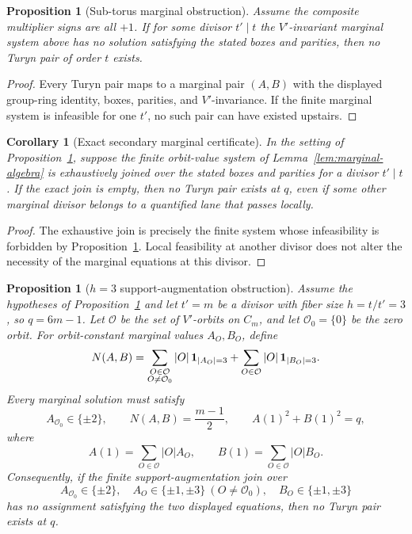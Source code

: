 \documentclass[11pt]{article}
\theoremstyle{plain}
\newtheorem{proposition}[theorem]{Proposition}
\newtheorem{corollary}[theorem]{Corollary}
\theoremstyle{definition}
\theoremstyle{remark}
\begin{document}
\begin{proposition}[Sub-torus marginal obstruction]\label{prop:t2-marginal}
Assume the composite multiplier signs are all $+1$. If for some divisor
$t'\mid t$ the $V'$-invariant marginal system above has no solution satisfying
the stated boxes and parities, then no Turyn pair of order $t$ exists.
\end{proposition}

\begin{proof}
Every Turyn pair maps to a marginal pair $(A,B)$ with the displayed group-ring
identity, boxes, parities, and $V'$-invariance. If the finite marginal system is
infeasible for one $t'$, no such pair can have existed upstairs.
\end{proof}

\begin{corollary}[Exact secondary marginal certificate]\label{cor:exact-secondary-marginal}
In the setting of Proposition~\ref{prop:t2-marginal}, suppose the finite
orbit-value system of Lemma~\ref{lem:marginal-algebra} is exhaustively joined
over the stated boxes and parities for a divisor $t'\mid t$.  If the exact join
is empty, then no Turyn pair exists at $q$, even if some other marginal divisor
belongs to a quantified lane that passes locally.
\end{corollary}

\begin{proof}
The exhaustive join is precisely the finite system whose infeasibility is
forbidden by Proposition~\ref{prop:t2-marginal}.  Local feasibility at another
divisor does not alter the necessity of the marginal equations at this
divisor.
\end{proof}

\begin{proposition}[$h=3$ support-augmentation obstruction]\label{prop:h3-support-augmentation}
Assume the hypotheses of Proposition~\ref{prop:t2-marginal} and let
$t'=m$ be a divisor with fiber size $h=t/t'=3$, so $q=6m-1$.  Let
$\mathcal O$ be the set of $V'$-orbits on $C_m$, and let
$\mathcal O_0=\{0\}$ be the zero orbit.  For orbit-constant marginal values
$A_O,B_O$, define
\[
  N(A,B)=
  \sum_{\substack{O\in\mathcal O\\O\ne\mathcal O_0}}
  |O|\,{\bf 1}_{|A_O|=3}
  +
  \sum_{O\in\mathcal O}|O|\,{\bf 1}_{|B_O|=3}.
\]
Every marginal solution must satisfy
\[
  A_{\mathcal O_0}\in\{\pm2\},\qquad N(A,B)=\frac{m-1}{2},
  \qquad A(1)^2+B(1)^2=q,
\]
where
\[
  A(1)=\sum_{O\in\mathcal O}|O|A_O,\qquad
  B(1)=\sum_{O\in\mathcal O}|O|B_O.
\]
Consequently, if the finite support-augmentation join over
\[
  A_{\mathcal O_0}\in\{\pm2\},\quad
  A_O\in\{\pm1,\pm3\}\ (O\ne\mathcal O_0),\quad
  B_O\in\{\pm1,\pm3\}
\]
has no assignment satisfying the two displayed equations, then no Turyn pair
exists at $q$.
\end{proposition}
\end{document}
